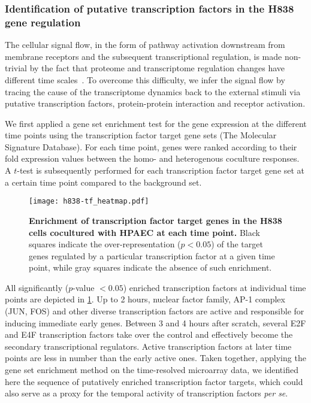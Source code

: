 \subsubsection{Identification of putative transcription factors in the H838 gene regulation}

The cellular signal flow, in the form of pathway activation
downstream from membrane receptors and the subsequent 
transcriptional 
regulation, is made non-trivial by the fact that proteome 
and transcriptome regulation changes have different time scales~\citep{Busch2008}. 
To overcome this difficulty, we infer the signal flow by 
tracing the cause of the transcriptome dynamics back to the external stimuli via putative transcription factors, protein-protein interaction
and receptor activation. 

We first applied a gene set enrichment test for the gene expression at 
the different time points using the transcription factor target gene sets (The Molecular Signature Database).
For each time point, 
genes were ranked according to their fold expression values
between the homo- and heterogenous coculture responses. 
A $t$-test is subsequently performed for each
transcription factor target gene set at a certain time 
point compared to the 
background set.

\begin{figure}[!ht]
\begin{center}
\texttt{[image: h838-tf\_heatmap.pdf]}
\end{center}
\caption[Enrichment of transcription factors]{
{\bf Enrichment of transcription factor target genes in
the H838 cells cocultured with HPAEC at each time point.} 
Black squares indicate the over-representation ($p<0.05$) of the  
target genes regulated by a particular transcription factor
at a given time point, while gray squares indicate the
absence of such enrichment.
}
\label{fig:h838_tf}
\end{figure}

All significantly ($p$-value $<0.05$) enriched 
transcription factors at individual time points are 
depicted in \ref{fig:h838_tf}. Up to 2 hours, nuclear
factor family, AP-1 complex (JUN, FOS) and other diverse
transcription factors are active and responsible for 
inducing immediate early genes. Between 3 and 4 hours after
scratch, several E2F and E4F transcription factors take
over the control and effectively become the secondary 
transcriptional regulators. Active transcription factors
at later time points are less in number than the early 
active ones.
Taken together, applying the gene set
enrichment method on the time-resolved microarray data, we identified here the
sequence of putatively enriched transcription factor targets, which could also serve as
a proxy for the temporal activity of transcription factors \emph{per se}.

